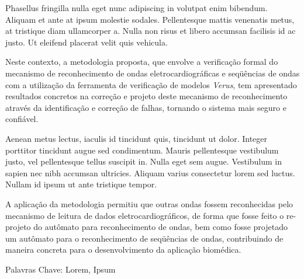 
Phasellus fringilla nulla eget nunc adipiscing in volutpat enim bibendum. 
Aliquam et ante at ipsum molestie sodales. Pellentesque mattis venenatis metus, 
at tristique diam ullamcorper a. Nulla non risus et libero accumsan facilisis 
id ac justo. Ut eleifend placerat velit quis vehicula. 

Neste contexto, a metodologia proposta, que envolve a verificação formal
do mecanismo de reconhecimento de ondas eletrocardiográficas e
seqüências de ondas com a utilização da ferramenta de verificação
de modelos {\em Verus}, tem apresentado resultados concretos na
correção e projeto deste mecanismo de reconhecimento através da
identificação e correção de falhas, tornando o sistema mais seguro e
confiável.

Aenean metus lectus, iaculis id tincidunt quis, 
tincidunt ut dolor. Integer porttitor tincidunt augue sed condimentum. Mauris pellentesque 
vestibulum justo, vel pellentesque tellus suscipit in. Nulla eget sem augue. 
Vestibulum in sapien nec nibh accumsan ultricies. Aliquam varius consectetur lorem sed luctus. 
Nullam id ipsum ut ante tristique tempor.

A aplicação da metodologia permitiu que outras ondas fossem
reconhecidas pelo mecanismo de leitura de dados
eletrocardiográficos, de forma que fosse feito o
re-projeto do autômato para reconhecimento de ondas, bem como
fosse projetado um autômato para o reconhecimento de seqüências
de ondas, contribuindo de maneira concreta para o desenvolvimento
da aplicação biomédica.


Palavras Chave: Lorem, Ipsum
